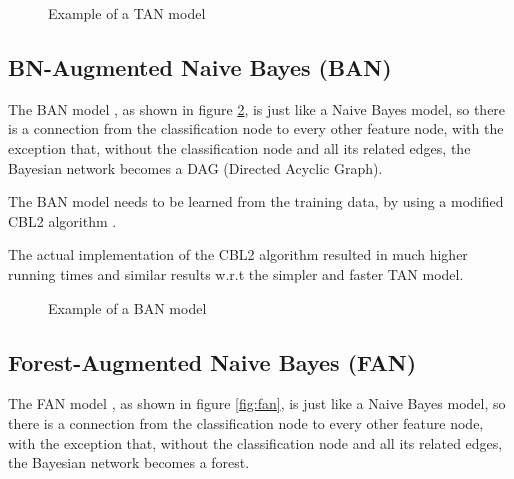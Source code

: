 \documentclass[twoside,twocolumn]{article}
\begin{document}
\begin{figure}[h]
  \caption{Example of a TAN model}
  \centering
  \label{fig:tan}
\end{figure}

\subsection{BN-Augmented Naive Bayes (BAN)}

The BAN model \cite{bib:friedman}, as shown in figure \ref{fig:ban}, is just like a Naive Bayes model, so there is a connection from the classification node to every other feature node, 
with the exception that, without the classification node and all its related edges, the Bayesian network becomes a DAG (Directed Acyclic Graph).

The BAN model needs to be learned from the training data, by using a modified CBL2 algorithm \cite{bib:chengb}.

The actual implementation of the CBL2 algorithm resulted in much higher running times and similar results w.r.t the simpler and faster TAN model.

\begin{figure}[h]
  \caption{Example of a BAN model}
  \centering
  \label{fig:ban}
\end{figure}

\subsection{Forest-Augmented Naive Bayes (FAN)}

The FAN model \cite{bib:jiang}, as shown in figure \ref{fig:fan}, is just like a Naive Bayes model, so there is a connection from the classification node to every other feature node, 
with the exception that, without the classification node and all its related edges, the Bayesian network becomes a forest.
\end{document}
